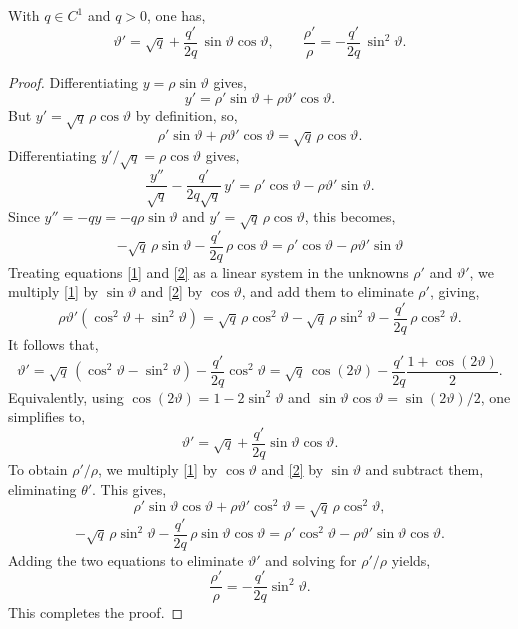 \documentclass[10pt,a4paper]{amsart}
\begin{document}
\begin{lemma}\label{lem:pruefer-ode}
With $q\in C^1$ and $q>0$, one has,
$$\vartheta'=\sqrt{q}+\frac{q'}{2q}\,\sin\vartheta\cos\vartheta,\qquad\frac{\rho'}{\rho}=-\frac{q'}{2q}\,\sin^2\vartheta.$$
\end{lemma}

\begin{proof}
Differentiating $y=\rho\sin\vartheta$ gives,
$$y'=\rho'\sin\vartheta+\rho\vartheta'\cos\vartheta.$$
But $y'=\sqrt{q}\,\rho\cos\vartheta$ by definition, so,
\begin{equation}\label{1} \rho'\sin\vartheta+\rho\vartheta'\cos\vartheta=\sqrt{q}\,\rho\cos\vartheta.
\end{equation}
Differentiating $y'/\sqrt{q}=\rho\cos\vartheta$ gives,
$$\frac{y''}{\sqrt{q}}-\frac{q'}{2q\sqrt{q}}\,y'=\rho'\cos\vartheta-\rho\vartheta'\sin\vartheta.$$
Since $y''=-q y=-q\rho\sin\vartheta$ and $y'=\sqrt{q}\,\rho\cos\vartheta$, this becomes,
\begin{equation}\label{2}
    -\sqrt{q}\,\rho\sin\vartheta - \frac{q'}{2q}\,\rho\cos\vartheta = \rho'\cos\vartheta-\rho\vartheta'\sin\vartheta
\end{equation}
Treating equations \eqref{1} and \eqref{2} as a linear system in the unknowns $\rho'$ and $\vartheta'$, we multiply \eqref{1} by $\sin\vartheta$ and \eqref{2} by $\cos\vartheta$, and add them to eliminate $\rho'$, giving,
$$\rho\vartheta'(\cos^2\vartheta+\sin^2\vartheta)= \sqrt{q}\,\rho\cos^2\vartheta - \sqrt{q}\,\rho\sin^2\vartheta - \frac{q'}{2q}\,\rho\cos^2\vartheta.$$
It follows that,
$$\vartheta'=\sqrt{q}\,(\cos^2\vartheta-\sin^2\vartheta)-\frac{q'}{2q}\cos^2\vartheta=\sqrt{q}\,\cos(2\vartheta)-\frac{q'}{2q}\frac{1+\cos(2\vartheta)}{2}.$$
Equivalently, using $\cos(2\vartheta)=1-2\sin^2\vartheta$ and $\sin\vartheta\cos\vartheta=\sin(2\vartheta)/2$, one simplifies to,
$$\vartheta'=\sqrt{q}+\frac{q'}{2q}\sin\vartheta\cos\vartheta.$$
To obtain $\rho'/\rho$, we multiply \eqref{1} by $\cos\vartheta$ and \eqref{2} by $\sin\vartheta$ and subtract them, eliminating $\theta'$. This gives,
$$\rho'\sin\vartheta\cos\vartheta+\rho\vartheta'\cos^2\vartheta= \sqrt{q}\,\rho\cos^2\vartheta,$$
$$-\sqrt{q}\,\rho\sin^2\vartheta - \frac{q'}{2q}\,\rho\sin\vartheta\cos\vartheta= \rho'\cos^2\vartheta-\rho\vartheta'\sin\vartheta\cos\vartheta.$$
Adding the two equations to eliminate $\vartheta'$ and solving for $\rho'/\rho$ yields,
$$\frac{\rho'}{\rho}=-\frac{q'}{2q}\sin^2\vartheta.$$
This completes the proof.

\end{proof}
\end{document}
